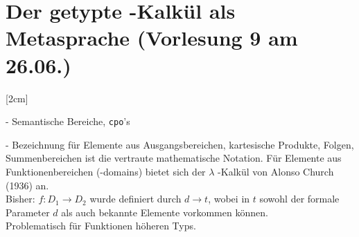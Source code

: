 \section{Der getypte \lambda -Kalkül als Metasprache \tiny (Vorlesung 9 am 26.06.)}
[2cm]
\begin{compactitem}
\item[-] Semantische Bereiche, \lstinline!cpo!'s
\item[-] Bezeichnung für Elemente aus Ausgangsbereichen, kartesische Produkte, Folgen, Summenbereichen ist die vertraute mathematische Notation. Für Elemente aus Funktionenbereichen (-domains) bietet sich der $\lambda$ -Kalkül von Alonso Church (1936) an.\\
Bisher: $f:D_1 \rightarrow D_2$ wurde definiert durch $d \rightarrow t$, wobei in $t$ sowohl der formale Parameter $d$ als auch bekannte Elemente vorkommen können.\\
Problematisch für Funktionen höheren Typs.\\
\end{compactitem}
